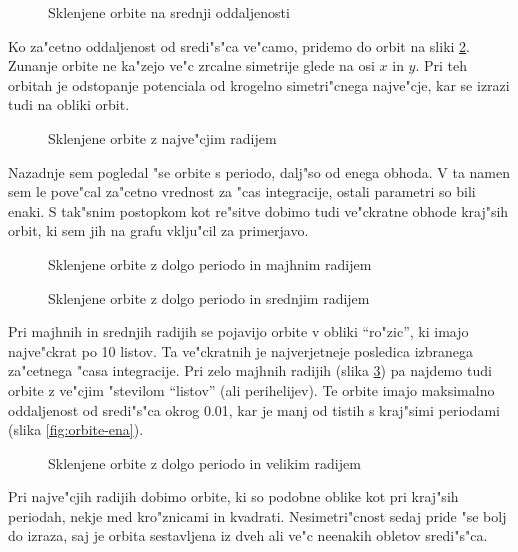 \documentclass[a4paper,10pt]{article}
\begin{document}
\begin{figure}[H]
 \centering
 
 \caption{Sklenjene orbite na srednji oddaljenosti}
 \label{fig:orbite-tri}
\end{figure}

Ko za"cetno oddaljenost od sredi"s"ca ve"camo, pridemo do orbit na sliki \ref{fig:orbite-stiri}. Zunanje orbite ne ka"zejo ve"c zrcalne simetrije glede na osi $x$ in $y$. Pri teh orbitah je odstopanje potenciala od krogelno simetri"cnega najve"cje, kar se izrazi tudi na obliki orbit. 

\begin{figure}[H]
 \centering
 
 \caption{Sklenjene orbite z najve"cjim radijem}
 \label{fig:orbite-stiri}
\end{figure}

Nazadnje sem pogledal "se orbite s periodo, dalj"so od enega obhoda. V ta namen sem le pove"cal za"cetno vrednost za "cas integracije, ostali parametri so bili enaki. S tak"snim postopkom kot re"sitve dobimo tudi ve"ckratne obhode kraj"sih orbit, ki sem jih na grafu vklju"cil za primerjavo. 

\begin{figure}[H]
 \centering
 
 \caption{Sklenjene orbite z dolgo periodo in majhnim radijem}
 \label{fig:orbite-dolge}
\end{figure}

\begin{figure}[H]
 \centering
 
 \caption{Sklenjene orbite z dolgo periodo in srednjim radijem}
 \label{fig:orbite-dolge-dva}
\end{figure}

Pri majhnih in srednjih radijih se pojavijo orbite v obliki ``ro"zic'', ki imajo najve"ckrat po 10 listov. Ta ve"ckratnih je najverjetneje posledica izbranega za"cetnega "casa integracije. Pri zelo majhnih radijih (slika \ref{fig:orbite-dolge}) pa najdemo tudi orbite z ve"cjim "stevilom ``listov'' (ali perihelijev). Te orbite imajo maksimalno oddaljenost od sredi"s"ca okrog 0.01, kar je manj od tistih s kraj"simi periodami (slika \ref{fig:orbite-ena}). 

\begin{figure}[H]
 \centering
 
 \caption{Sklenjene orbite z dolgo periodo in velikim radijem}
 \label{fig:orbite-dolge-tri}
\end{figure}

Pri najve"cjih radijih dobimo orbite, ki so podobne oblike kot pri kraj"sih periodah, nekje med kro"znicami in kvadrati. Nesimetri"cnost sedaj pride "se bolj do izraza, saj je orbita sestavljena iz dveh ali ve"c neenakih obletov sredi"s"ca. 
 
\end{document}
